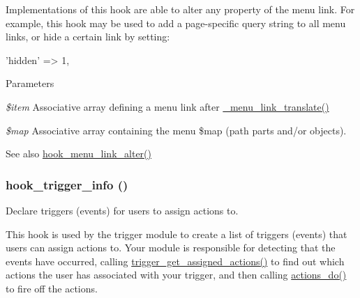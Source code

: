 Implementations of this hook are able to alter any property of the menu link. For example, this hook may be used to add a page-\/specific query string to all menu links, or hide a certain link by setting: 
\begin{DoxyCode}
   'hidden' => 1,
\end{DoxyCode}



\begin{DoxyParams}{Parameters}
\item[{\em \$item}]Associative array defining a menu link after \hyperlink{group__menu_ga75bf09f752589011fc9256b041cf7cc0}{\_\-menu\_\-link\_\-translate()} \item[{\em \$map}]Associative array containing the menu \$map (path parts and/or objects).\end{DoxyParams}
\begin{DoxySeeAlso}{See also}
\hyperlink{group__hooks_ga53f6d87f599e7f585ca84a7e0874df81}{hook\_\-menu\_\-link\_\-alter()} 
\end{DoxySeeAlso}
\hypertarget{group__hooks_ga6796483976be1fa22589582444c6fdbb}{
\subsubsection[{hook\_\-trigger\_\-info}]{\setlength{\rightskip}{0pt plus 5cm}hook\_\-trigger\_\-info ()}}
\label{group__hooks_ga6796483976be1fa22589582444c6fdbb}
Declare triggers (events) for users to assign actions to.

This hook is used by the trigger module to create a list of triggers (events) that users can assign actions to. Your module is responsible for detecting that the events have occurred, calling \hyperlink{trigger_8module_a1d52e4ba7b5602e21b75ebe6be90ebc3}{trigger\_\-get\_\-assigned\_\-actions()} to find out which actions the user has associated with your trigger, and then calling \hyperlink{group__actions_gacfece93b3453da7c572057dde3453122}{actions\_\-do()} to fire off the actions.

